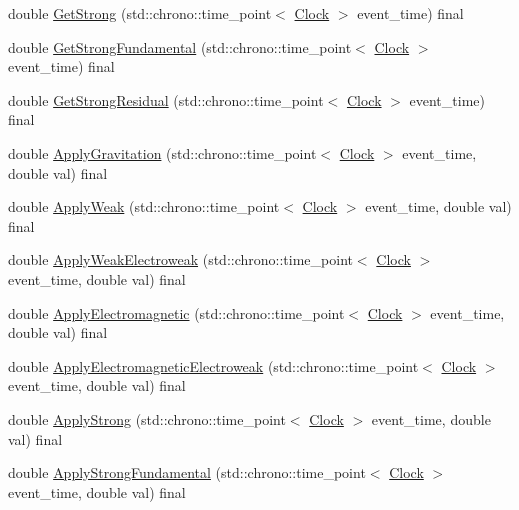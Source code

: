 \begin{DoxyCompactItemize}
\item 
double \hyperlink{class_dimension_ae36aadad4ae84735a5ff73bff4eb97b1}{Get\+Strong} (std\+::chrono\+::time\+\_\+point$<$ \hyperlink{universe_8h_a0ef8d951d1ca5ab3cfaf7ab4c7a6fd80}{Clock} $>$ event\+\_\+time) final
\item 
double \hyperlink{class_dimension_ad0d067d7f9dc4841b0ad280979ebe7af}{Get\+Strong\+Fundamental} (std\+::chrono\+::time\+\_\+point$<$ \hyperlink{universe_8h_a0ef8d951d1ca5ab3cfaf7ab4c7a6fd80}{Clock} $>$ event\+\_\+time) final
\item 
double \hyperlink{class_dimension_aeee6025f17d9cd1bf7f324d715a30691}{Get\+Strong\+Residual} (std\+::chrono\+::time\+\_\+point$<$ \hyperlink{universe_8h_a0ef8d951d1ca5ab3cfaf7ab4c7a6fd80}{Clock} $>$ event\+\_\+time) final
\item 
double \hyperlink{class_dimension_a9474b0dd3f6321a92bfe4375bb4b2266}{Apply\+Gravitation} (std\+::chrono\+::time\+\_\+point$<$ \hyperlink{universe_8h_a0ef8d951d1ca5ab3cfaf7ab4c7a6fd80}{Clock} $>$ event\+\_\+time, double val) final
\item 
double \hyperlink{class_dimension_a72b8ab8d676b4df6b9a6ef948f5693c9}{Apply\+Weak} (std\+::chrono\+::time\+\_\+point$<$ \hyperlink{universe_8h_a0ef8d951d1ca5ab3cfaf7ab4c7a6fd80}{Clock} $>$ event\+\_\+time, double val) final
\item 
double \hyperlink{class_dimension_abf490cabd486afa660f17940ed0d17e6}{Apply\+Weak\+Electroweak} (std\+::chrono\+::time\+\_\+point$<$ \hyperlink{universe_8h_a0ef8d951d1ca5ab3cfaf7ab4c7a6fd80}{Clock} $>$ event\+\_\+time, double val) final
\item 
double \hyperlink{class_dimension_a65bcd3c09792cf53b1f614eff49cf111}{Apply\+Electromagnetic} (std\+::chrono\+::time\+\_\+point$<$ \hyperlink{universe_8h_a0ef8d951d1ca5ab3cfaf7ab4c7a6fd80}{Clock} $>$ event\+\_\+time, double val) final
\item 
double \hyperlink{class_dimension_ab13e8ed50a4373274636e542c917db01}{Apply\+Electromagnetic\+Electroweak} (std\+::chrono\+::time\+\_\+point$<$ \hyperlink{universe_8h_a0ef8d951d1ca5ab3cfaf7ab4c7a6fd80}{Clock} $>$ event\+\_\+time, double val) final
\item 
double \hyperlink{class_dimension_a621e8f7f24db86e836c5b3da0f019290}{Apply\+Strong} (std\+::chrono\+::time\+\_\+point$<$ \hyperlink{universe_8h_a0ef8d951d1ca5ab3cfaf7ab4c7a6fd80}{Clock} $>$ event\+\_\+time, double val) final
\item 
double \hyperlink{class_dimension_afb01fb9e469da18899d4b14e5f095ece}{Apply\+Strong\+Fundamental} (std\+::chrono\+::time\+\_\+point$<$ \hyperlink{universe_8h_a0ef8d951d1ca5ab3cfaf7ab4c7a6fd80}{Clock} $>$ event\+\_\+time, double val) final

\end{DoxyCompactItemize}
